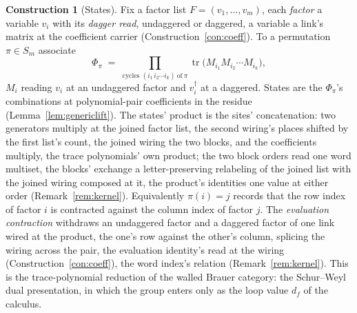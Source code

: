 \documentclass[11pt]{article}
\theoremstyle{definition}
\newtheorem{construction}{Construction}
\newcommand{\tr}{\operatorname{tr}}
\begin{document}
\begin{construction}[States]\label{con:states}
Fix a factor list $F=(v_1,\dots,v_m)$, each \emph{factor} a
variable $v_i$ with its \emph{dagger read}, undaggered or daggered,
a variable a link's matrix at the coefficient carrier
(Construction~\ref{con:coeff}). To a permutation
$\pi\in S_m$ associate
\[
\Phi_\pi\;=\;\prod_{\text{cycles } (i_1\,i_2\cdots i_k)\ \text{of}\ \pi}
\tr\!\big(M_{i_1}M_{i_2}\cdots M_{i_k}\big),
\]
$M_i$ reading $v_i$ at an undaggered factor and $v_i^{\dagger}$ at a
daggered.
States are the $\Phi_\pi$'s combinations at polynomial-pair
coefficients in the residue (Lemma~\ref{lem:genericlift}). The
states' product is the sites' concatenation: two generators
multiply at the joined factor list, the second wiring's places
shifted by the first list's count, the joined wiring the two
blocks, and the coefficients multiply, the trace polynomials' own
product; the two block orders read one word multiset, the blocks'
exchange a letter-preserving relabeling of the joined list with
the joined wiring composed at it, the product's identities one
value at either order (Remark~\ref{rem:kernel}). Equivalently
$\pi(i)=j$ records that the row index of factor $i$ is contracted
against the column index of factor $j$. The \emph{evaluation
contraction} withdraws an undaggered factor and a daggered factor
of one link wired at the product, the one's row against the other's
column, splicing the wiring across the pair, the evaluation
identity's read at the wiring (Construction~\ref{con:coeff}), the
word index's relation (Remark~\ref{rem:kernel}). This is the trace-polynomial
reduction of the walled Brauer category: the Schur--Weyl dual
presentation, in which the group enters only as the loop value $d_f$
of the calculus.
\end{construction}
\end{document}
